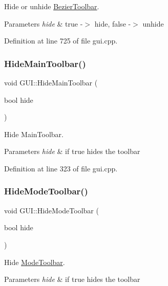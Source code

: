Hide or unhide \mbox{\hyperlink{structBezierToolbar}{Bezier\+Toolbar}}. 


\begin{DoxyParams}{Parameters}
{\em hide} & true -\/$>$ hide, false -\/$>$ unhide \\
\hline
\end{DoxyParams}


Definition at line 725 of file gui.\+cpp.

\mbox{\label{classGUI_aa115b0163bfbf518dd201f4f02476b75}} 
\subsubsection{\texorpdfstring{Hide\+Main\+Toolbar()}{HideMainToolbar()}}
{\footnotesize\ttfamily void G\+U\+I\+::\+Hide\+Main\+Toolbar (\begin{DoxyParamCaption}\item[{bool}]{hide }\end{DoxyParamCaption})}



Hide Main\+Toolbar. 


\begin{DoxyParams}{Parameters}
{\em hide} & if true hides the toolbar \\
\hline
\end{DoxyParams}


Definition at line 323 of file gui.\+cpp.

\mbox{\label{classGUI_a9517c0ad1e4c2b39faab8050f8133151}} 
\subsubsection{\texorpdfstring{Hide\+Mode\+Toolbar()}{HideModeToolbar()}}
{\footnotesize\ttfamily void G\+U\+I\+::\+Hide\+Mode\+Toolbar (\begin{DoxyParamCaption}\item[{bool}]{hide }\end{DoxyParamCaption})}



Hide \mbox{\hyperlink{structModeToolbar}{Mode\+Toolbar}}. 


\begin{DoxyParams}{Parameters}
{\em hide} & if true hides the toolbar \\
\hline
\end{DoxyParams}


